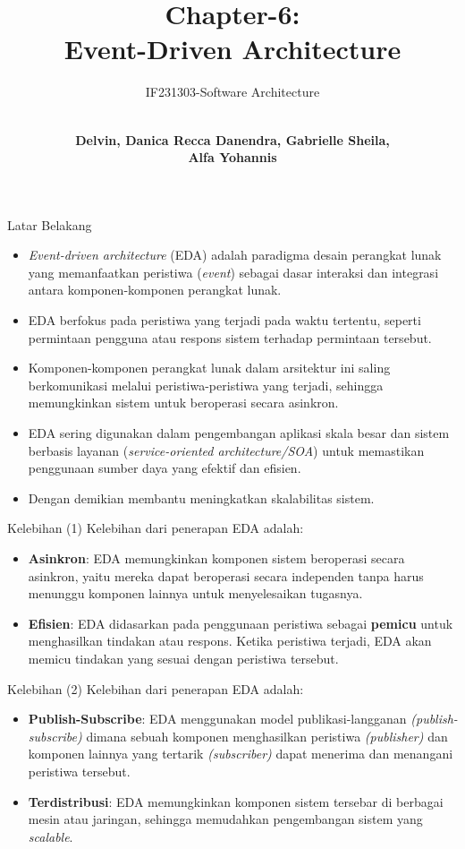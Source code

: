 \documentclass[aspectratio=169, table]{beamer}
\subtitle{IF231303-Software Architecture}
\title{\Large Chapter-6:\\Event-Driven Architecture}
\author[Pradita]{\\\small{\textbf{Delvin, Danica Recca Danendra, Gabrielle Sheila,\\Alfa Yohannis}}}
\begin{document}
	\frame{\titlepage}

\begin{frame}{Latar Belakang}
    \vspace{25pt}
    \begin{itemize}
        \item \textit{Event-driven architecture} (EDA) adalah paradigma desain perangkat lunak yang memanfaatkan peristiwa (\textit{event}) sebagai dasar interaksi dan integrasi antara komponen-komponen perangkat lunak.
        \item EDA berfokus pada peristiwa yang terjadi pada waktu tertentu, seperti permintaan pengguna atau respons sistem terhadap permintaan tersebut.
        \item Komponen-komponen perangkat lunak dalam arsitektur ini saling berkomunikasi melalui peristiwa-peristiwa yang terjadi, sehingga memungkinkan sistem untuk beroperasi secara asinkron.
        \item EDA sering digunakan dalam pengembangan aplikasi skala besar dan sistem berbasis layanan (\textit{service-oriented architecture/SOA}) untuk memastikan penggunaan sumber daya yang efektif dan efisien.
        \item Dengan demikian membantu meningkatkan skalabilitas sistem.
    \end{itemize}

\end{frame}

\begin{frame}{Kelebihan (1)}
    Kelebihan dari penerapan EDA adalah:
    \begin{itemize}
        \item \textbf{Asinkron}: EDA memungkinkan komponen sistem beroperasi secara asinkron, yaitu mereka dapat beroperasi secara independen tanpa harus menunggu komponen lainnya untuk menyelesaikan tugasnya.
        \item \textbf{Efisien}: EDA didasarkan pada penggunaan peristiwa sebagai \textbf{pemicu} untuk menghasilkan tindakan atau respons. Ketika peristiwa terjadi, EDA akan memicu tindakan yang sesuai dengan peristiwa tersebut.
    \end{itemize}
\end{frame}

\begin{frame}{Kelebihan (2)}
    Kelebihan dari penerapan EDA adalah:
    \begin{itemize}
        \item \textbf{Publish-Subscribe}: EDA menggunakan model publikasi-langganan \textit{(publish-subscribe)} dimana sebuah komponen menghasilkan peristiwa \textit{(publisher)} dan komponen lainnya yang tertarik \textit{(subscriber)} dapat menerima dan menangani peristiwa tersebut.
        \item \textbf{Terdistribusi}: EDA memungkinkan komponen sistem tersebar di berbagai mesin atau jaringan, sehingga memudahkan pengembangan sistem yang \textit{scalable}.
    \end{itemize}
\end{frame}
\end{document}
